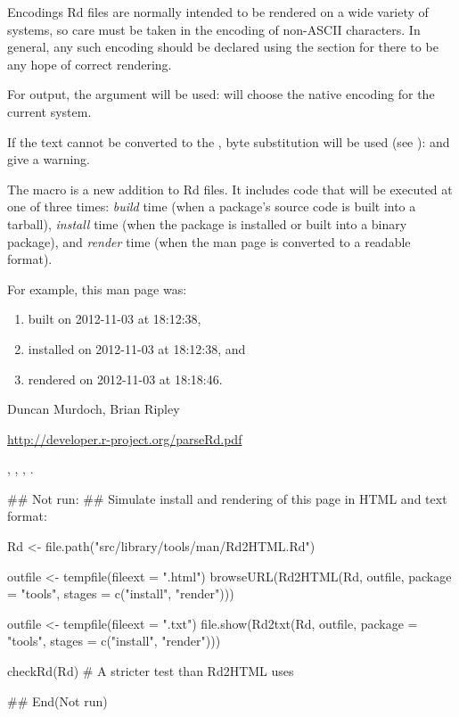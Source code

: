 %
\begin{Section}{Encodings}
Rd files are normally intended to be rendered on a wide variety of
systems, so care must be taken in the encoding of non-ASCII
characters.  In general, any such encoding should be declared using
the  section for there to be any hope of correct
rendering.

For output, the  argument will be used:
 will choose the native encoding for the
current system.

If the text cannot be converted to the , byte
substitution will be used (see ): 
and  give a warning. 
\end{Section}
%
\begin{Note}\relax
The  macro is a new addition to Rd files.  It includes
\R{} code that will be executed at one of three times: \emph{build} time
(when a package's source code is built into a tarball), 
\emph{install} time (when the package is installed or
built into a binary package), and \emph{render} time (when the man
page is converted to a readable format).

For example, this man page was:
\begin{enumerate}

\item built on
2012-11-03 at 18:12:38,
\item installed on
2012-11-03 at 18:12:38, and
\item rendered on
2012-11-03 at 18:18:46.

\end{enumerate}

\end{Note}
%
\begin{Author}\relax
Duncan Murdoch, Brian Ripley
\end{Author}
%
\begin{References}\relax
 \url{http://developer.r-project.org/parseRd.pdf} 
\end{References}
%
\begin{SeeAlso}\relax
{}, ,
, .
\end{SeeAlso}
%
\begin{Examples}
\begin{ExampleCode}


## Not run: 
## Simulate install and rendering of this page in HTML and text format:

Rd <- file.path("src/library/tools/man/Rd2HTML.Rd")

outfile <- tempfile(fileext = ".html")
browseURL(Rd2HTML(Rd, outfile, package = "tools",
          stages = c("install", "render")))

outfile <- tempfile(fileext = ".txt")
file.show(Rd2txt(Rd, outfile, package = "tools",
          stages = c("install", "render")))

checkRd(Rd) # A stricter test than Rd2HTML uses

## End(Not run)
\end{ExampleCode}
\end{Examples}
